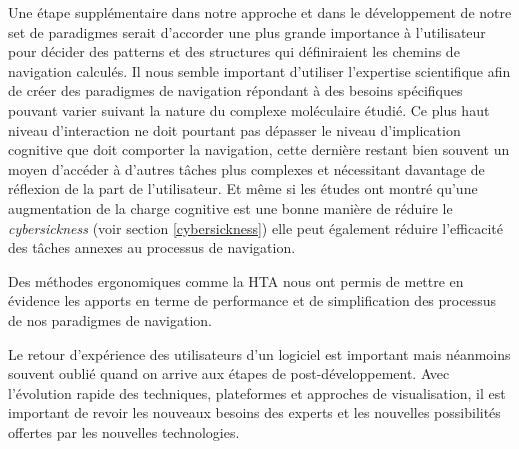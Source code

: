 Une étape supplémentaire dans notre approche et dans le développement de notre set de paradigmes serait d'accorder une plus grande importance à l'utilisateur pour décider des patterns et des structures qui définiraient les chemins de navigation calculés. Il nous semble important d'utiliser l'expertise scientifique afin de créer des paradigmes de navigation répondant à des besoins spécifiques pouvant varier suivant la nature du complexe moléculaire étudié. Ce plus haut niveau d'interaction ne doit pourtant pas dépasser le niveau d'implication cognitive que doit comporter la navigation, cette dernière restant bien souvent un moyen d'accéder à d'autres tâches plus complexes et nécessitant davantage de réflexion de la part de l'utilisateur. Et même si les études ont montré qu'une augmentation de la charge cognitive est une bonne manière de réduire le \textit{cybersickness} (voir section \ref{cybersickness}) elle peut également réduire l'efficacité des tâches annexes au processus de navigation.

Des méthodes ergonomiques comme la HTA nous ont permis de mettre en évidence les apports en terme de performance et de simplification des processus de nos paradigmes de navigation.

Le retour d'expérience des utilisateurs d'un logiciel est important mais néanmoins souvent oublié quand on arrive aux étapes de post-développement. Avec l'évolution rapide des techniques, plateformes et approches de visualisation, il est important de revoir les nouveaux besoins des experts et les nouvelles possibilités offertes par les nouvelles technologies. 






